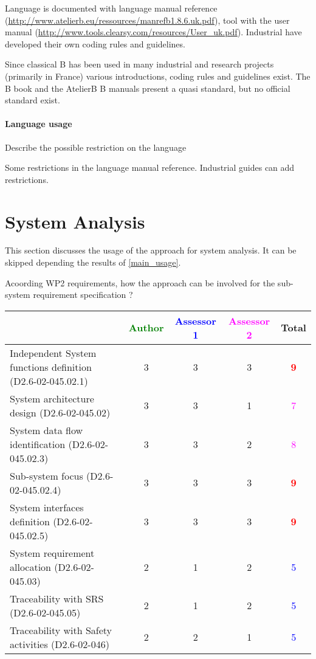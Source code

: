 \begin{author_comment}

Language is documented with language manual reference (\url{http://www.atelierb.eu/ressources/manrefb1.8.6.uk.pdf}), tool with the user manual (\url{http://www.tools.clearsy.com/resources/User_uk.pdf}). Industrial have developed their own coding rules and guidelines.
\end{author_comment}

\begin{assessor2}
Since classical B has been used in many industrial and research projects (primarily in France) various introductions, coding rules and guidelines exist. The B book and the AtelierB B manuals present a quasi standard, but no official standard exist.
\end{assessor2}

\paragraph{Language usage} Describe the possible restriction on the language
\begin{author_comment}
Some restrictions in the language manual reference. Industrial guides can add restrictions.
\end{author_comment}

\section{System Analysis}
This section discusses the usage of the approach for system analysis.
It can be skipped depending the results of \ref{main_usage}.

Acoording WP2 requirements, how the approach can be involved for the sub-system requirement specification ?

\begin{tabular}{|l | c | c | c | c|}
\hline
& \textcolor{green}{Author} & \textcolor{blue}{Assessor 1} & \textcolor{magenta}{Assessor 2} & Total \\
\hline
Independent System functions definition (D2.6-02-045.02.1)  & 3     & 3     & 3     & \textcolor{red}{\textbf{9}} \\
\hline 
System architecture design (D2.6-02-045.02) & 3     & 3     & 1     & \textcolor{magenta}{7} \\
\hline
System data flow identification (D2.6-02-045.02.3)  & 3     & 3     & 2     & \textcolor{magenta}{8} \\
\hline
Sub-system focus (D2.6-02-045.02.4)  & 3     & 3     & 3     & \textcolor{red}{\textbf{9}} \\
\hline
System interfaces definition (D2.6-02-045.02.5)  & 3     & 3     & 3     & \textcolor{red}{\textbf{9}} \\
\hline
System requirement allocation (D2.6-02-045.03)  & 2     & 1     & 2     & \textcolor{blue}{5} \\
\hline
Traceability with SRS (D2.6-02-045.05)  & 2     & 1     & 2     & \textcolor{blue}{5} \\
\hline
Traceability with Safety activities (D2.6-02-046)  & 2     & 2     & 1     & \textcolor{blue}{5} \\
\hline
\end{tabular}


